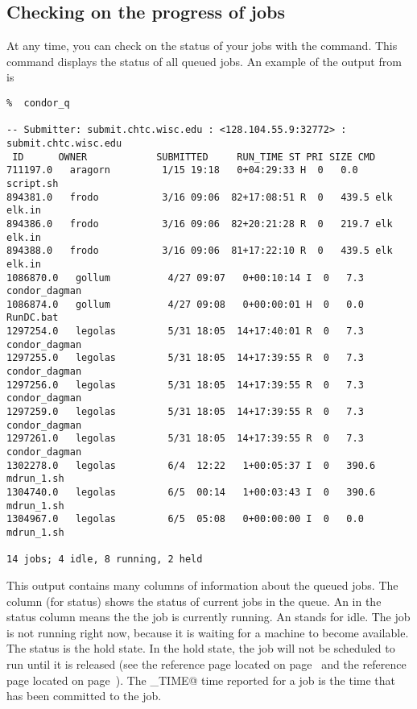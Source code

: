 \subsection{Checking on the progress of jobs}
At any time, you can check on the status of your jobs with the 
command.
This command displays the status of all queued jobs.
An example of the output from  is
\footnotesize
\begin{verbatim}
%  condor_q

-- Submitter: submit.chtc.wisc.edu : <128.104.55.9:32772> : submit.chtc.wisc.edu
 ID      OWNER            SUBMITTED     RUN_TIME ST PRI SIZE CMD               
711197.0   aragorn         1/15 19:18   0+04:29:33 H  0   0.0  script.sh         
894381.0   frodo           3/16 09:06  82+17:08:51 R  0   439.5 elk elk.in        
894386.0   frodo           3/16 09:06  82+20:21:28 R  0   219.7 elk elk.in        
894388.0   frodo           3/16 09:06  81+17:22:10 R  0   439.5 elk elk.in        
1086870.0   gollum          4/27 09:07   0+00:10:14 I  0   7.3  condor_dagman     
1086874.0   gollum          4/27 09:08   0+00:00:01 H  0   0.0  RunDC.bat         
1297254.0   legolas         5/31 18:05  14+17:40:01 R  0   7.3  condor_dagman     
1297255.0   legolas         5/31 18:05  14+17:39:55 R  0   7.3  condor_dagman     
1297256.0   legolas         5/31 18:05  14+17:39:55 R  0   7.3  condor_dagman     
1297259.0   legolas         5/31 18:05  14+17:39:55 R  0   7.3  condor_dagman     
1297261.0   legolas         5/31 18:05  14+17:39:55 R  0   7.3  condor_dagman     
1302278.0   legolas         6/4  12:22   1+00:05:37 I  0   390.6 mdrun_1.sh        
1304740.0   legolas         6/5  00:14   1+00:03:43 I  0   390.6 mdrun_1.sh        
1304967.0   legolas         6/5  05:08   0+00:00:00 I  0   0.0  mdrun_1.sh        

14 jobs; 4 idle, 8 running, 2 held

\end{verbatim} 
\normalsize
This output contains many columns of information about the
queued jobs.
The \verb@ST@ column (for status) shows the status of
current jobs in the queue. An \verb@R@ in the status column
means the the job is currently running.
An \verb@I@ stands for idle. 
The job is not running right
now, because it is waiting for a machine to become available. 
The status
\verb@H@ is the hold state. In the hold state,
the job will not be scheduled to
run until it is released (see the 
reference page located on page~\pageref{man-condor-hold}
and the 
reference page located on page~\pageref{man-condor-release}).
The \verb@RUN_TIME@ time reported for a job is the time that has been
committed to the job.

